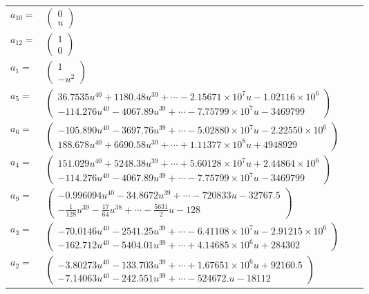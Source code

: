 \documentclass[1p]{elsarticle_modified}
\theoremstyle{definition}
\begin{document}
\begin{tabular}{m{7pt} m{180pt} m{7pt} m{180pt} }
\flushright $a_{10}=$&$\begin{pmatrix}0\\u\end{pmatrix}$ \\
\flushright $a_{12}=$&$\begin{pmatrix}1\\0\end{pmatrix}$ \\
\flushright $a_{1}=$&$\begin{pmatrix}1\\- u^2\end{pmatrix}$ \\
\flushright $a_{5}=$&$\begin{pmatrix}36.7535 u^{40}+1180.48 u^{39}+\cdots-2.15671\times10^{7} u-1.02116\times10^{6}\\-114.276 u^{40}-4067.89 u^{39}+\cdots-7.75799\times10^{7} u-3469799\end{pmatrix}$ \\
\flushright $a_{6}=$&$\begin{pmatrix}-105.890 u^{40}-3697.76 u^{39}+\cdots-5.02880\times10^{7} u-2.22550\times10^{6}\\188.678 u^{40}+6690.58 u^{39}+\cdots+1.11377\times10^{8} u+4948929\end{pmatrix}$ \\
\flushright $a_{4}=$&$\begin{pmatrix}151.029 u^{40}+5248.38 u^{39}+\cdots+5.60128\times10^{7} u+2.44864\times10^{6}\\-114.276 u^{40}-4067.89 u^{39}+\cdots-7.75799\times10^{7} u-3469799\end{pmatrix}$ \\
\flushright $a_{9}=$&$\begin{pmatrix}-0.996094 u^{40}-34.8672 u^{39}+\cdots-720833 u-32767.5\\-\frac{1}{128} u^{39}-\frac{17}{64} u^{38}+\cdots-\frac{5631}{2} u-128\end{pmatrix}$ \\
\flushright $a_{3}=$&$\begin{pmatrix}-70.0146 u^{40}-2541.25 u^{39}+\cdots-6.41108\times10^{7} u-2.91215\times10^{6}\\-162.712 u^{40}-5404.01 u^{39}+\cdots+4.14685\times10^{6} u+284302\end{pmatrix}$ \\
\flushright $a_{2}=$&$\begin{pmatrix}-3.80273 u^{40}-133.703 u^{39}+\cdots+1.67651\times10^{6} u+92160.5\\-7.14063 u^{40}-242.551 u^{39}+\cdots-524672. u-18112\end{pmatrix}$ \\

\end{tabular}
\end{document}
